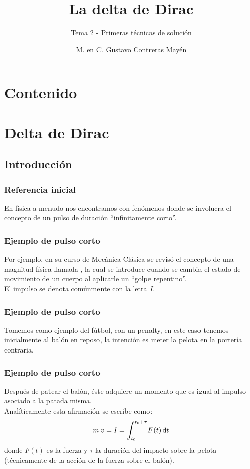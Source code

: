 \documentclass[12pt]{beamer}
\date{}
\title{\large{La delta de Dirac}}
\subtitle{Tema 2 - Primeras técnicas de solución}
\author{M. en C. Gustavo Contreras Mayén}
\begin{document}
\maketitle
\fontsize{14}{14}\selectfont
{}

\section*{Contenido}

\section{Delta de Dirac}
\subsection{Introducción}

\begin{frame}
\frametitle{Referencia inicial}
En física a menudo nos encontramos con fenómenos donde se involucra el concepto de un pulso de duración \enquote{infinitamente corto}.
\end{frame}

\begin{frame}
\frametitle{Ejemplo de pulso corto}
Por ejemplo, en su curso de Mecánica Clásica se revisó el concepto de una magnitud física llamada , \pause la cual se introduce cuando se cambia el estado de movimiento de un cuerpo al aplicarle un \enquote{golpe repentino}.
\\
\bigskip
\pause
El impulso se denota comúnmente con la letra $I$.
\end{frame}

\begin{frame}
\frametitle{Ejemplo de pulso corto}
Tomemos como ejemplo del fútbol, con un penalty, \pause en este caso tenemos inicialmente al balón en reposo, \pause la intención es meter la pelota en la portería contraria.
\end{frame}

\begin{frame}
\frametitle{Ejemplo de pulso corto}
Después de patear el balón, éste adquiere un momento que es igual al impulso asociado a la patada misma.
\\
\bigskip
\pause
Analíticamente esta afirmación se escribe como:
\pause
\begin{align*}
m \, v = I = \scaleint{6ex}_{\bs t_{0}}^{t_{0} + \tau} F (t) \dd{t}
\end{align*}
donde $F (t)$ es la fuerza y $\tau$ la duración del impacto sobre la pelota (técnicamente de la acción de la fuerza sobre el balón).
\end{frame}
\end{document}
